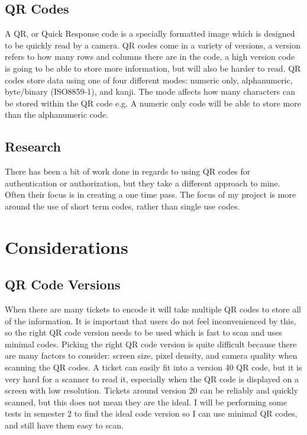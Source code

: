 \documentclass[]{report}   %
\begin{document}
\subsection{QR Codes}  
A QR, or Quick Response code \cite{QR} is a specially formatted image which is designed to be quickly read by a camera. QR codes come in a variety of versions, a version refers to how many rows and columns there are in the code, a high version code is going to be able to store more information, but will also be harder to read. QR codes store data using one of four different modes: numeric only, alphanumeric, byte/binary (ISO8859-1), and kanji. The mode affects how many characters can be stored within the QR code e.g. A numeric only code will be able to store more than the alphanumeric code.

\subsection{Research}
There has been a bit of work done in regards to using QR codes for authentication or authorization, but they take a different approach to mine. Often their focus is in creating a one time pass. The focus of my project is more around the use of short term codes, rather than single use codes.


\section{Considerations} 
\subsection{QR Code Versions}
When there are many tickets to encode it will take multiple QR codes to store all of the information. It is important that users do not feel inconvenienced by this, so the right QR code version needs to be used which is fast to scan and uses minimal codes. Picking the right QR code version is quite difficult because there are many factors to consider: screen size, pixel density, and camera quality when scanning the QR codes. A ticket can easily fit into a version 40 QR code, but it is very hard for a scanner to read it, especially when the QR code is displayed on a screen with low resolution. Tickets around version 20 can be reliably and quickly scanned, but this does not mean they are the ideal. I will be performing some tests in semester 2 to find the ideal code version so I can use minimal QR codes, and still have them easy to scan.
\end{document}
